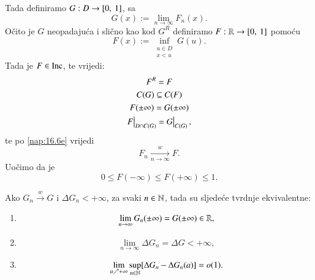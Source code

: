 \begin{nap}
\begin{enumerate}[label=(\alph*)]
        Tada definiramo $G : D \to [{0}, \:{1}]$, sa 
        \begin{equation*}
            G(x) := \lim\limits_{n \to \infty} F_n (x).
        \end{equation*}
        O\v cito je $G$ neopadaju\' ca i sli\v cno kao kod $G^R$ definiramo $F:\mathbb{R} \to [{0}, \:{1}]$ pomo\' cu
        \begin{equation*}
            F (x) := \inf\limits_{
                \begin{smallmatrix}
                    u \in D\\
                    x < u
                \end{smallmatrix}
            } G(u).
        \end{equation*}
        Tada je $F \in \mathrm{Inc}$, te vrijedi:
        \begin{equation*}
            \begin{gathered}
                F^R = F\\
                C(G) \subseteq C(F)\\
                F(\pm \infty) = G(\pm \infty)\\
                \restr{F}{D \cap C(G)} = \restr{G}{C(G)},
            \end{gathered}
        \end{equation*}
        te po \ref{nap:16.6e} vrijedi
        \begin{equation*}
            F_n \xrightarrow[n \to \infty]{w} F.
        \end{equation*}
        Uo\v cimo da je
        \begin{equation*}
            0 \leq F(-\infty) \leq F(+\infty) \leq 1.
        \end{equation*}
    \end{enumerate}
\end{nap}

\begin{lm}  \label{lm:16.7}
    Ako $G_n \xrightarrow{w} G$ i $\Delta G_n < +\infty$, za svaki $n \in \mathbb{N}$, tada su sljede\' ce tvrdnje ekvivalentne:
    \begin{enumerate}[label=(\roman*)]
        \item \label{lm:16.7.1}
        \begin{equation*}
            \lim\limits_{n \to \infty} G_n (\pm \infty) = G(\pm \infty) \in \mathbb{R},
        \end{equation*}
        \item \label{lm:16.7.2}
        \begin{equation*}
            \lim\limits_{n \to \infty} \Delta G_n = \Delta G < +\infty,
        \end{equation*}
        \item \label{lm:16.7.3}
        \begin{equation*}
            \lim\limits_{a \nearrow +\infty} \sup\limits_{n \in \mathbb{N}} [ \Delta G_n - \Delta G_n (a) ] = o(1).
        \end{equation*}
    \end{enumerate}
\end{lm}

